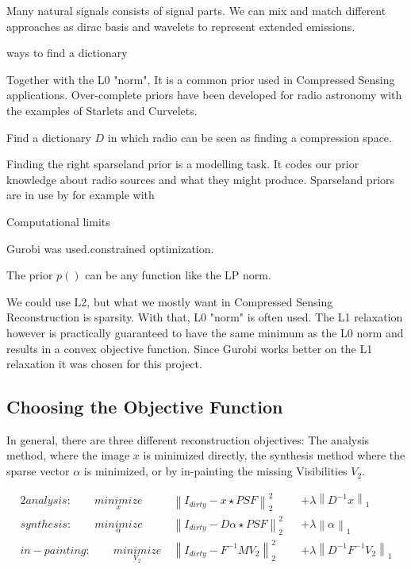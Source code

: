 Many natural signals consists of signal parts. We can mix and match different approaches as dirac basis and wavelets to represent extended emissions.

ways to find a dictionary

Together with the L0 "norm",
It is a common prior used in Compressed Sensing applications. Over-complete priors have been developed for radio astronomy with the examples of Starlets\cite{starck2015starlet} and Curvelets\cite{starck2003astronomical}. 

Find a dictionary $D$ in which radio can be seen as finding a compression space.


Finding the right sparseland prior is a modelling task. It codes our prior knowledge about radio sources and what they might produce. Sparseland priors are in use by for example with 

Computational limits

Gurobi\cite{gurobi2018optimizer} was used.constrained optimization.

The prior $p()$ can be any function like the LP norm.

We could use L2, but what we mostly want in Compressed Sensing Reconstruction is sparsity. 
With that, L0 "norm" is often used. 
The L1 relaxation however is practically guaranteed to have the same minimum as the L0 norm and results in a convex objective function. Since Gurobi works better on the L1 relaxation it was chosen for this project.

\subsection{Choosing the Objective Function} \label{cs:objective}
In general, there are three different reconstruction objectives: The analysis method, where the image $x$ is minimized directly, the synthesis method where the sparse vector $\alpha$ is minimized, or by in-painting the missing Visibilities $V_2$.

\begin{alignat*}{2}
analysis:\qquad \underset{x}{minimize} \:& \left \| I_{dirty} - x \star PSF \right \|_2^2 &&+  \lambda \left \| D^{-1}x \right \|_1 \\
synthesis:\qquad \underset{\alpha}{minimize} \:& \left \| I_{dirty} - D \alpha \star PSF \right \|_2^2 &&+ \lambda \left \| \alpha \right \|_1 \\
in-painting:\qquad \underset{V_2}{minimize} \:& \left \|  I_{dirty} - F^{-1} M V_2 \right \|_2^2 &&+ \lambda \left \| D^{-1}F^{-1}V_2\right \|_1
\end{alignat*}

